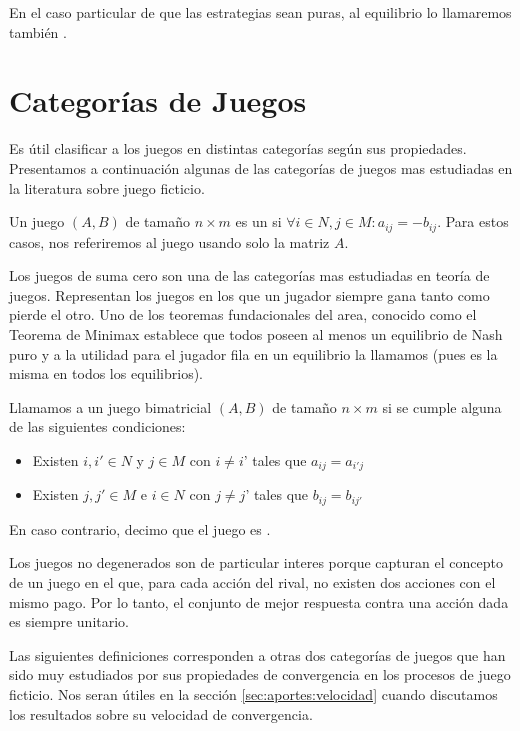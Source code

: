 En el caso particular de que las estrategias sean puras, al equilibrio lo llamaremos también .

\section{Categorías de Juegos}

Es útil clasificar a los juegos en distintas categorías según sus propiedades. Presentamos a continuación algunas de las categorías de juegos mas estudiadas en la literatura sobre juego ficticio.

\begin{definition}
    Un juego $(A, B)$ de tamaño $n \times m$ es un  si $\forall i \in N, j \in M : a_{ij} = -b_{ij}$. Para estos casos, nos referiremos al juego usando solo la matriz $A$.
\end{definition}

Los juegos de suma cero son una de las categorías mas estudiadas en teoría de juegos. Representan los juegos en los que un jugador siempre gana tanto como pierde el otro. Uno de los teoremas fundacionales del area, conocido como el Teorema de Minimax \cite{nash:minmax} establece que todos poseen al menos un equilibrio de Nash puro y a la utilidad para el jugador fila en un equilibrio la llamamos  (pues es la misma en todos los equilibrios).

\begin{definition}
    Llamamos  a un juego bimatricial $(A, B)$ de tamaño $n \times m$ si se cumple alguna de las siguientes condiciones:
    \begin{itemize}
        \item Existen $i, i' \in N$ y $j \in M$ con $i \neq i$' tales que $a_{ij} = a_{i'j}$
        \item Existen $j, j' \in M$ e $i \in N$ con $j \neq j$' tales que $b_{ij} = b_{ij'}$
    \end{itemize}
    En caso contrario, decimo que el juego es .
\end{definition}
Los juegos no degenerados son de particular interes porque capturan el concepto de un juego en el que, para cada acción del rival, no existen dos acciones con el mismo pago. Por lo tanto, el conjunto de mejor respuesta contra una acción dada es siempre unitario.

Las siguientes definiciones corresponden a otras dos categorías de juegos que han sido muy estudiados por sus propiedades de convergencia en los procesos de juego ficticio. Nos seran útiles en la sección \ref{sec:aportes:velocidad} cuando discutamos los resultados sobre su velocidad de convergencia.

